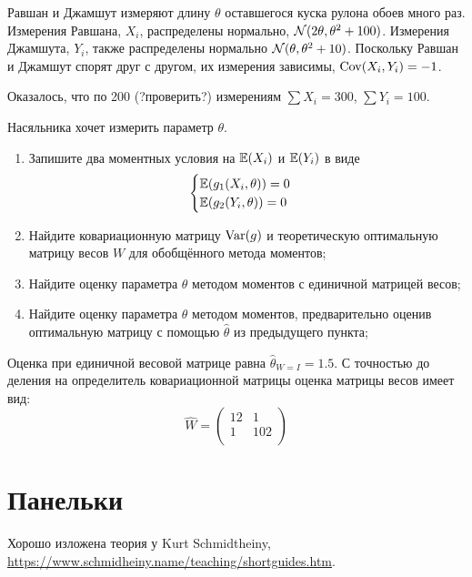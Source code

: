 \begin{problem}
Равшан и Джамшут измеряют длину $\theta$ оставшегося куска рулона обоев много раз.
Измерения Равшана, $X_i$, распределены нормально, $\mathcal{N}(2\theta, \theta^2 + 100)$.
Измерения Джамшута, $Y_i$, также распределены нормально $\mathcal{N}(\theta, \theta^2 + 10)$.
Поскольку Равшан и Джамшут спорят друг с другом, их измерения зависимы, $\operatorname{Cov}(X_i, Y_i)=-1$.

	Оказалось, что по 200 (?проверить?) измерениям $\sum X_i=300$, $\sum Y_i = 100$.

Насяльника хочет измерить параметр $\theta$.

\begin{enumerate}
\item Запишите два моментных условия на $\operatorname{\mathbb E}(X_i)$ и $\operatorname{\mathbb E}(Y_i)$ в виде
	\[
		\begin{cases}
			\operatorname{\mathbb E}(g_1(X_i, \theta))=0 \\
			\operatorname{\mathbb E}(g_2(Y_i, \theta))=0 \\
		\end{cases}
	\]
\item Найдите ковариационную матрицу $\operatorname{Var}(g)$ и теоретическую оптимальную матрицу весов $W$ для обобщённого метода моментов;
\item Найдите оценку параметра $\theta$ методом моментов с единичной матрицей весов;
\item Найдите оценку параметра $\theta$ методом моментов, предварительно оценив оптимальную матрицу с помощью $\hat \theta$ из предыдущего пункта;
\end{enumerate}

\begin{sol}
Оценка при единичной весовой матрице равна $\hat\theta_{W=I}=1.5$.
С точностью до деления на определитель ковариационной матрицы оценка матрицы весов имеет вид:
\[
\hat W =
	\begin{pmatrix}
		12 & 1 \\
		1 & 102 \\
	\end{pmatrix}
\]

\end{sol}
\end{problem}


\section{Панельки}

Хорошо изложена теория у Kurt Schmidtheiny, \url{https://www.schmidheiny.name/teaching/shortguides.htm}.

